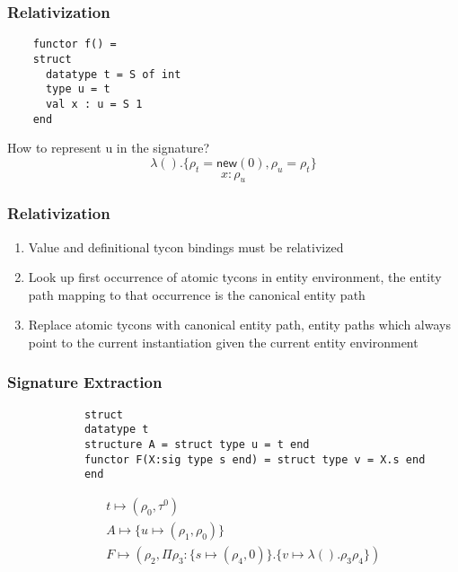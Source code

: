 \documentclass{beamer}
\newcommand{\newx}{\ensuremath{\mathsf{new}}}
\begin{document}
		\begin{frame}[fragile]
			\frametitle{Relativization}
	\begin{lstlisting}
	functor f() = 
	struct
	  datatype t = S of int
	  type u = t
	  val x : u = S 1
	end
	\end{lstlisting}
		
		\begin{block}{How to represent u in the signature?}
		\[ \lambda().\{ \rho_t = \newx(0), \rho_u = \rho_t \} \]
		\[ x : \rho_u \] 	
		\end{block}
		\end{frame}
		
	\begin{frame}
		\frametitle{Relativization}
		\begin{enumerate}
			\item Value and definitional tycon bindings must be relativized
			\item Look up first occurrence of atomic tycons in entity environment, the entity path mapping to that occurrence is the canonical entity path
			\item Replace atomic tycons with canonical entity path, entity paths which always point to the current instantiation given the current entity environment
		\end{enumerate}
		
	\end{frame}
		
		\begin{frame}[fragile]
			\frametitle{Signature Extraction}
			\begin{lstlisting}
			struct
			datatype t
			structure A = struct type u = t end
			functor F(X:sig type s end) = struct type v = X.s end
			end
			\end{lstlisting}
			
			\begin{eqnarray*}
			  & & t\mapsto (\rho_0, \tau^0) \\
			  & & A\mapsto \{u\mapsto (\rho_1, \rho_0)\} \\
			  & & F\mapsto (\rho_2, \Pi\rho_3:\{s\mapsto (\rho_4, 0)\}.\{v\mapsto \lambda().\rho_3\rho_4\})
			\end{eqnarray*}
		\end{frame}
\end{document}
